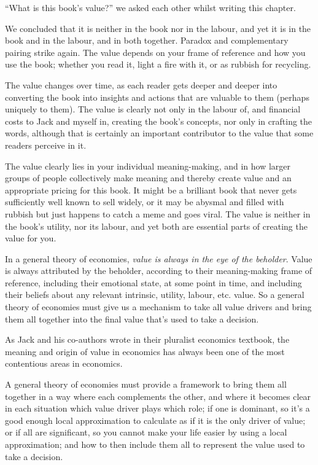 \begin{longstoryblock}
“What is this book’s value?” we asked each other whilst writing this chapter. 


We concluded that it is neither in the book nor in the labour, and yet it is in the book and in the labour, and in both together. Paradox and complementary pairing strike again. The value depends on your frame of reference and how you use the book; whether you read it, light a fire with it, or as rubbish for recycling. 


The value changes over time, as each reader gets deeper and deeper into converting the book into insights and actions that are valuable to them (perhaps uniquely to them). The value is clearly not only in the labour of, and financial costs to Jack and myself in, creating the book’s concepts, nor only in crafting the words, although that is certainly an important contributor to the value that some readers perceive in it.


The value clearly lies in your individual meaning-making, and in how larger groups of people collectively make meaning and thereby create value and an appropriate pricing for this book. It might be a brilliant book that never gets sufficiently well known to sell widely, or it may be abysmal and filled with rubbish but just happens to catch a meme and goes viral. The value is neither in the book’s utility, nor its labour, and yet both are essential parts of creating the value for you. 
\end{longstoryblock}


In a general theory of economies, \emph{value is always in the eye of the beholder}. Value is always attributed by the beholder, according to their meaning-making frame of reference, including their emotional state, at some point in time, and including their beliefs about any relevant intrinsic, utility, labour, etc. value. So a general theory of economies  must give us a mechanism to take all value drivers\cite{mason-post-capitalism}  and bring them all together into the final value that’s used to take a decision.


As Jack and his co-authors wrote in their pluralist economics textbook\cite{reardon-introducing},  the meaning and origin of value in economics has always been one of the most contentious areas in economics.  


A general theory of economies must provide a framework to bring them all together in a way where each complements the other, and where it becomes clear in each situation which value driver plays which role; if one is dominant, so it's a good enough local approximation to calculate as if it is the only driver of value; or if all are significant, so you cannot make your life easier by using a local approximation; and how to then include them all to represent the value used to take a decision.


